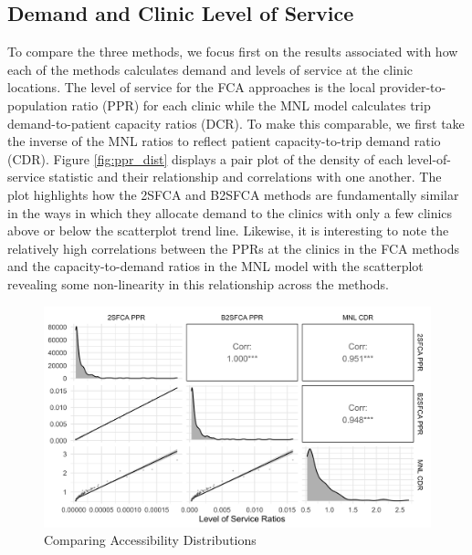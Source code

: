 \documentclass[]{elsarticle} %
\begin{document}
\hypertarget{demand-and-clinic-level-of-service}{%
\subsection{Demand and Clinic Level of
Service}\label{demand-and-clinic-level-of-service}}

To compare the three methods, we focus first on the results associated
with how each of the methods calculates demand and levels of service at
the clinic locations. The level of service for the FCA approaches is the
local provider-to-population ratio (PPR) for each clinic while the MNL
model calculates trip demand-to-patient capacity ratios (DCR). To make
this comparable, we first take the inverse of the MNL ratios to reflect
patient capacity-to-trip demand ratio (CDR). Figure \ref{fig:ppr_dist}
displays a pair plot of the density of each level-of-service statistic
and their relationship and correlations with one another. The plot
highlights how the 2SFCA and B2SFCA methods are fundamentally similar in
the ways in which they allocate demand to the clinics with only a few
clinics above or below the scatterplot trend line. Likewise, it is
interesting to note the relatively high correlations between the PPRs at
the clinics in the FCA methods and the capacity-to-demand ratios in the
MNL model with the scatterplot revealing some non-linearity in this
relationship across the methods.

\begin{figure}
\includegraphics[width=1\linewidth]{./img/pair_plot_ppr} \caption{\label{fig:ppr_dist}Comparing Accessibility Distributions}\label{fig:ppr_dist_fig}
\end{figure}
\end{document}
